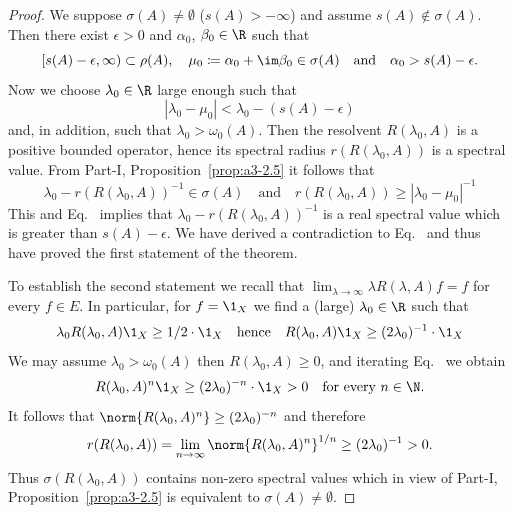 \begin{proof}
	We suppose $\sigma(A) \neq \emptyset$ (\ie $s(A) > -\infty$) and assume $s(A) \notin \sigma(A)$.
	Then there exist $\epsilon > 0$ and $\alpha_{0}$, $\beta_{0} \in \R$ such that
	\begin{equation}\label{eq:b3-1.1}
		[s(A)-\epsilon,\infty) \subset \rho(A), \quad \mu_{0} \coloneqq \alpha_{0} + \im\beta_{0} \in \sigma(A) \quad \text{and} \quad \alpha_{0} > s(A)-\epsilon.
	\end{equation}
	Now we choose $\lambda_{0} \in \R$ large enough such that
	\begin{equation}\label{eq:b3-1.2}
		|\lambda_{0} - \mu_{0}| < \lambda_{0} - (s(A) - \epsilon)
	\end{equation}
	and, in addition, such that $\lambda_{0} > \omega_{0}(A)$.
	Then the resolvent $R(\lambda_{0},A)$ is a positive bounded operator, hence its spectral radius $r(R(\lambda_{0},A))$ is a spectral value.
	From Part-I, Proposition~\ref{prop:a3-2.5} it follows that
	\begin{equation}\label{eq:b3-1.3}
		\lambda_{0} - r(R(\lambda_{0},A))^{-1} \in \sigma(A) \quad \text{and} \quad r(R(\lambda_{0},A)) \geq |\lambda_{0} - \mu_{0}|^{-1}
	\end{equation}
	This and Eq.~ implies that $\lambda_{0} - r(R(\lambda_{0},A))^{-1}$ is a real spectral value which is greater than $s(A) - \epsilon$.
	We have derived a contradiction to Eq.~ and thus have proved the first statement of the theorem.
	
	To establish the second statement we recall that $\lim_{\lambda \to \infty}\lambda R(\lambda,A)f = f$ for every $f \in E$.
	In particular, for $f = \1_{X}$ we find a (large) $\lambda_{0} \in \R$ such that
	\begin{equation}\label{eq:b3-1.4}
		\lambda_{0}R(\lambda_{0},A)\1_{X} \geq 1/2\cdot\1_{X} \quad \text{hence} \quad R(\lambda_{0},A)\1_{X} \geq (2\lambda_{0})^{-1}\cdot\1_{X}
	\end{equation}
	We may assume $\lambda_{0} > \omega_{0}(A)$ then $R(\lambda_{0},A) \geq 0$, and iterating Eq.~ we obtain
	\begin{equation}\label{eq:b3-1.5}
		R(\lambda_{0},A)^{n}\1_{X} \geq (2\lambda_{0})^{-n}\cdot\1_{X} > 0 \quad \text{for every } n \in \N.
	\end{equation}
	It follows that $\norm{R(\lambda_{0},A)^{n}} \geq (2\lambda_{0})^{-n}$ and therefore
	\begin{equation}\label{eq:b3-1.6}
		r(R(\lambda_{0},A)) = \lim_{n \to \infty}\norm{R(\lambda_{0},A)^{n}}^{1/n} \geq (2\lambda_{0})^{-1} > 0.
	\end{equation}
	Thus $\sigma(R(\lambda_{0},A))$ contains non-zero spectral values which in view of Part-I, Proposition~\ref{prop:a3-2.5} is equivalent to $\sigma(A) \neq \emptyset$.
\end{proof}
